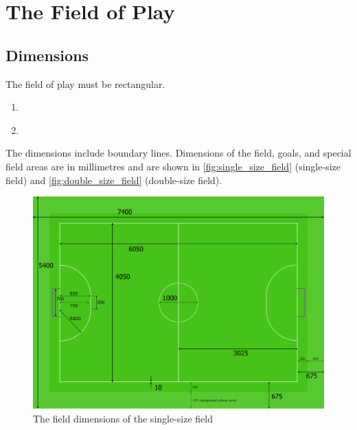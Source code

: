 \section{The Field of Play}\label{sec:field-of-play}

\subsection{Dimensions}
The field of play must be rectangular.
\begin{enumerate}
\item \textbf{}
\item \textbf{}
\end{enumerate}
The dimensions include boundary lines.
Dimensions of the field, goals, and special field areas are in millimetres and
are shown in \autoref{fig:single_size_field} (single-size field) and
\autoref{fig:double_size_field} (double-size field).

\begin{figure}[ht] %
  \centering
  \includegraphics[width=0.8\columnwidth]{img/field_2012_drawing.png}
  \caption{The field dimensions of the single-size field}
  \label{fig:single_size_field}
\end{figure}

